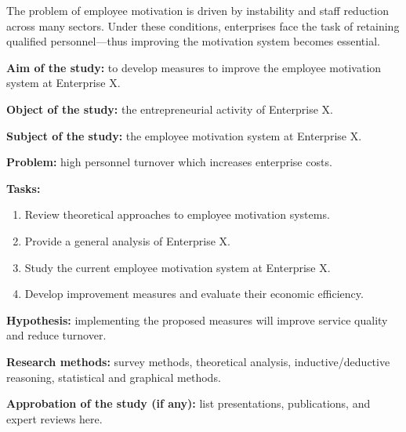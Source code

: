 The problem of employee motivation is driven by instability and staff reduction across many sectors. Under these conditions, enterprises face the task of retaining qualified personnel—thus improving the motivation system becomes essential.

\textbf{Aim of the study:} to develop measures to improve the employee motivation system at Enterprise X.

\textbf{Object of the study:} the entrepreneurial activity of Enterprise X.

\textbf{Subject of the study:} the employee motivation system at Enterprise X.

\textbf{Problem:} high personnel turnover which increases enterprise costs.

\textbf{Tasks:}
\begin{enumerate}
  \item Review theoretical approaches to employee motivation systems.
  \item Provide a general analysis of Enterprise X.
  \item Study the current employee motivation system at Enterprise X.
  \item Develop improvement measures and evaluate their economic efficiency.
\end{enumerate}

\textbf{Hypothesis:} implementing the proposed measures will improve service quality and reduce turnover.

\textbf{Research methods:} survey methods, theoretical analysis, inductive/deductive reasoning, statistical and graphical methods.

\textbf{Approbation of the study (if any):} list presentations, publications, and expert reviews here.
